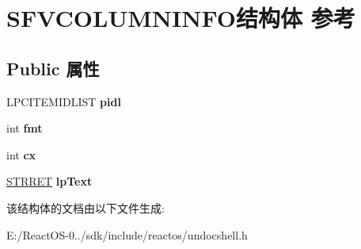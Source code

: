 \hypertarget{struct_s_f_v_c_o_l_u_m_n_i_n_f_o}{}\section{S\+F\+V\+C\+O\+L\+U\+M\+N\+I\+N\+F\+O结构体 参考}
\label{struct_s_f_v_c_o_l_u_m_n_i_n_f_o}
\subsection*{Public 属性}
\begin{DoxyCompactItemize}
\item 
\mbox{\label{struct_s_f_v_c_o_l_u_m_n_i_n_f_o_a2d2125ecd330ab8faf2b0766bd9c22b2}} 
L\+P\+C\+I\+T\+E\+M\+I\+D\+L\+I\+ST {\bfseries pidl}
\item 
\mbox{\label{struct_s_f_v_c_o_l_u_m_n_i_n_f_o_afa78f7a5a9d89bbf0d70ff39b016803f}} 
int {\bfseries fmt}
\item 
\mbox{\label{struct_s_f_v_c_o_l_u_m_n_i_n_f_o_a89e9d9f595a61bc0755f6a48c5fa273f}} 
int {\bfseries cx}
\item 
\mbox{\label{struct_s_f_v_c_o_l_u_m_n_i_n_f_o_abd04e146de39f858dae8a7dcd8282983}} 
\hyperlink{struct___s_t_r_r_e_t}{S\+T\+R\+R\+ET} {\bfseries lp\+Text}
\end{DoxyCompactItemize}


该结构体的文档由以下文件生成\+:\begin{DoxyCompactItemize}
\item 
E\+:/\+React\+O\+S-\/0../sdk/include/reactos/undocshell.\+h\end{DoxyCompactItemize}

